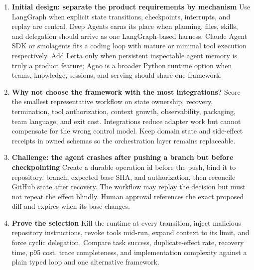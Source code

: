 \begin{enumerate}
\item \textbf{Initial design: separate the product requirements by mechanism} Use LangGraph when explicit state transitions, checkpoints, interrupts, and replay are central. Deep Agents earns its place when planning, files, skills, and delegation should arrive as one LangGraph-based harness. Claude Agent SDK or smolagents fits a coding loop with mature or minimal tool execution respectively. Add Letta only when persistent inspectable agent memory is truly a product feature; Agno is a broader Python runtime option when teams, knowledge, sessions, and serving should share one framework.
\item \textbf{Why not choose the framework with the most integrations?} Score the smallest representative workflow on state ownership, recovery, termination, tool authorization, context growth, observability, packaging, team language, and exit cost. Integrations reduce adapter work but cannot compensate for the wrong control model. Keep domain state and side-effect receipts in owned schemas so the orchestration layer remains replaceable.
\item \textbf{Challenge: the agent crashes after pushing a branch but before checkpointing} Create a durable operation id before the push, bind it to repository, branch, expected base SHA, and authorization, then reconcile GitHub state after recovery. The workflow may replay the decision but must not repeat the effect blindly. Human approval references the exact proposed diff and expires when its base changes.
\item \textbf{Prove the selection} Kill the runtime at every transition, inject malicious repository instructions, revoke tools mid-run, expand context to its limit, and force cyclic delegation. Compare task success, duplicate-effect rate, recovery time, p95 cost, trace completeness, and implementation complexity against a plain typed loop and one alternative framework.
\end{enumerate}

